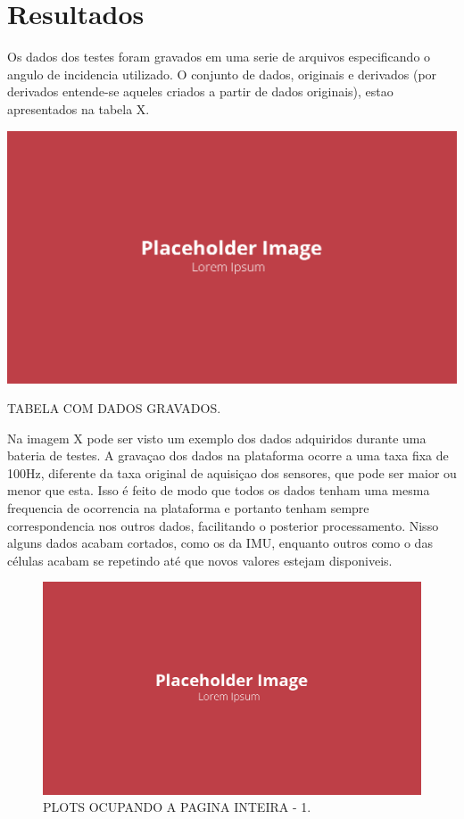 \chapter{Resultados}\label{chp:res}

Os dados dos testes foram gravados em uma serie de arquivos especificando o angulo de incidencia utilizado. O conjunto de dados, originais e derivados (por derivados entende-se aqueles criados a partir de dados originais), estao apresentados na tabela X.

\begin{table}[!ht]
    \centering
    \includegraphics[width=.8\linewidth]{figuras/placeholder.png}
    \caption{TABELA COM DADOS GRAVADOS\cite{autor}.}
    \label{fig:placeholder}
\end{table}

Na imagem X pode ser visto um exemplo dos dados adquiridos durante uma bateria de testes. A gravaçao dos dados na plataforma ocorre a uma taxa fixa de 100Hz, diferente da taxa original de aquisiçao dos sensores, que pode ser maior ou menor que esta. Isso é feito de modo que todos os dados tenham uma mesma frequencia de ocorrencia na plataforma e portanto tenham sempre correspondencia nos outros dados, facilitando o posterior processamento. Nisso alguns dados acabam cortados, como os da IMU, enquanto outros como o das células acabam se repetindo até que novos valores estejam disponiveis.

\begin{figure}[!ht]
    \centering
    \includegraphics[width=.8\linewidth]{figuras/placeholder.png}
    \caption{PLOTS OCUPANDO A PAGINA INTEIRA - 1\cite{autor}.}
    \label{fig:placeholder}
\end{figure}

